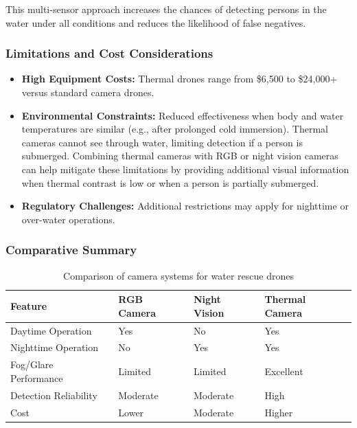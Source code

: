 This multi-sensor approach increases the chances of detecting persons in the water under all conditions and reduces the likelihood of false negatives.

\subsubsection{Limitations and Cost Considerations}

\begin{itemize}
    \item \textbf{High Equipment Costs:} Thermal drones range from \$6,500 to \$24,000+ versus standard camera drones\cite{dslrpros_sar_drones}.
    \item \textbf{Environmental Constraints:} Reduced effectiveness when body and water temperatures are similar (e.g., after prolonged cold immersion). Thermal cameras cannot see through water, limiting detection if a person is submerged\cite{fireapparatus_thermal_water_rescue}. Combining thermal cameras with RGB or night vision cameras can help mitigate these limitations by providing additional visual information when thermal contrast is low or when a person is partially submerged.
    \item \textbf{Regulatory Challenges:} Additional restrictions may apply for nighttime or over-water operations.
\end{itemize}

\subsubsection{Comparative Summary}

\begin{table}[h]
\centering
\begin{tabular}{|l|l|l|l|}
\hline
\textbf{Feature} & \textbf{RGB Camera} & \textbf{Night Vision} & \textbf{Thermal Camera} \\ \hline
Daytime Operation & Yes & No & Yes \\ \hline
Nighttime Operation & No & Yes & Yes \\ \hline
Fog/Glare Performance & Limited & Limited & Excellent \\ \hline
Detection Reliability & Moderate & Moderate & High \\ \hline
Cost & Lower & Moderate & Higher \\ \hline
\end{tabular}
\caption{Comparison of camera systems for water rescue drones}
\end{table}


